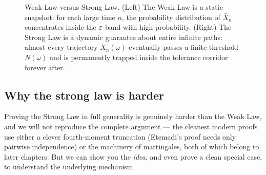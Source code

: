 \begin{figure}[H]
\caption{Weak Law versus Strong Law. (Left) The Weak Law is a static snapshot: for each large time $n$, the probability distribution of $\bar X_n$ concentrates inside the $\varepsilon$-band with high probability. (Right) The Strong Law is a dynamic guarantee about entire infinite paths: almost every trajectory $\bar X_n(\omega)$ eventually passes a finite threshold $N(\omega)$ and is permanently trapped inside the tolerance corridor forever after.}
\label{ch20:fig-weak-vs-strong}
\end{figure}

\subsection{Why the strong law is harder}

Proving the Strong Law in full generality is genuinely harder than the Weak Law, and we will not reproduce the complete argument --- the cleanest modern proofs use either a clever fourth-moment truncation (Etemadi's proof needs only pairwise independence) or the machinery of martingales, both of which belong to later chapters. But we can show you the \emph{idea}, and even prove a clean special case, to understand the underlying mechanism.


